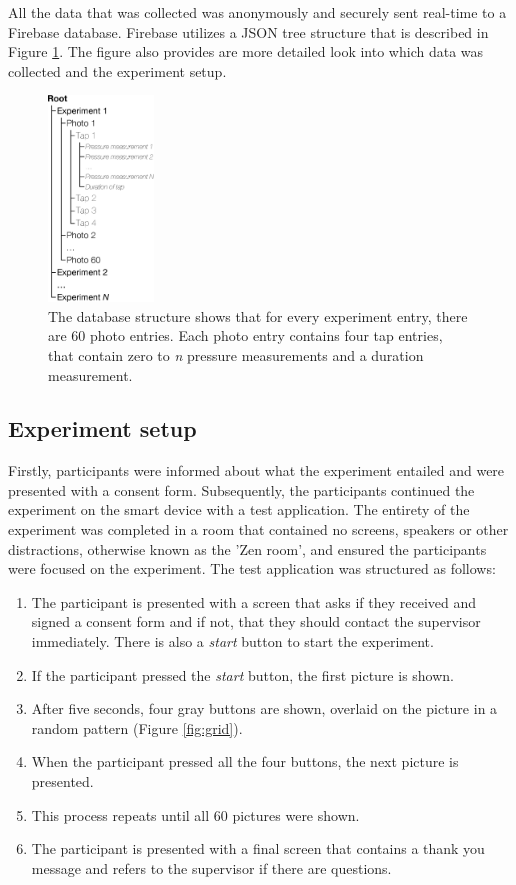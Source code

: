 \documentclass{sigchi}
\begin{document}
All the data that was collected was anonymously and securely sent real-time to a Firebase \cite{google:firebase} database. Firebase utilizes a JSON \cite{json} tree structure that is described in Figure \ref{fig:datastructure}. The figure also provides are more detailed look into which data was collected and the experiment setup.
\begin{figure}[t]
    \centering
    \includegraphics[width=0.25\textwidth]{images/Datastructure.eps}
    \caption{The database structure shows that for every experiment entry, there are 60 photo entries. Each photo entry contains four tap entries, that contain zero to \textit{n} pressure measurements and a duration measurement.}
    \label{fig:datastructure}
\end{figure}


\subsection{Experiment setup} %
\label{sub:experiment_setup}
Firstly, participants were informed about what the experiment entailed and were presented with a consent form. Subsequently, the participants continued the experiment on the smart device with a test application. The entirety of the experiment was completed in a room that contained no screens, speakers or other distractions, otherwise known as the 'Zen room', and ensured the participants were focused on the experiment. The test application was structured as follows:
\begin{enumerate}
  \item The participant is presented with a screen that asks if they received and signed a consent form and if not, that they should contact the supervisor immediately. There is also a \textit{start} button to start the experiment.
  \item If the participant pressed the \textit{start} button, the first picture is shown.
  \item After five seconds, four gray buttons are shown, overlaid on the picture in a random pattern (Figure \ref{fig:grid}).
  \item When the participant pressed all the four buttons, the next picture is presented.
  \item This process repeats until all 60 pictures were shown.
  \item The participant is presented with a final screen that contains a thank you message and refers to the supervisor if there are questions.
\end{enumerate}
\end{document}
